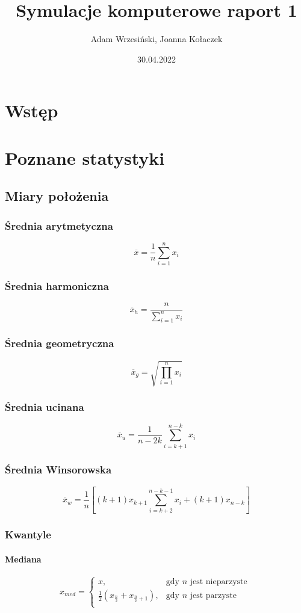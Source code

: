 \documentclass{article}
\title{Symulacje komputerowe raport 1}
\author{Adam Wrzesiński, Joanna Kołaczek}
\date{30.04.2022}
\theoremstyle{break}
\begin{document}
	\maketitle
	\tableofcontents
	\clearpage
\section{Wstęp}

\section{Poznane statystyki}
\subsection{Miary położenia}
\subsubsection{Średnia arytmetyczna}
$$\overline{x}=\frac{1}{n}\sum\limits_{i=1}^{n}x_i$$
\subsubsection{Średnia harmoniczna}
$$\overline{x}_h=\frac{n}{\sum\limits_{i=1}^{n}x_i}$$
\subsubsection{Średnia geometryczna}
$$\overline{x}_g=\sqrt{\prod\limits_{i=1}^{n}x_i}$$
\subsubsection{Średnia ucinana}
$$\overline{x}_u=\frac{1}{n-2k}\sum\limits_{i=k+1}^{n-k}x_i$$
\subsubsection{Średnia Winsorowska}
$$\overline{x}_w=\frac{1}{n}[(k+1)x_{k+1}\sum\limits_{i=k+2}^{n-k-1}x_i +(k+1)x_{n-k}]$$
\subsubsection{Kwantyle}
\paragraph{Mediana}
$$x_{med}=
\begin{cases}
	x, &  \text{gdy $n$ jest nieparzyste }\\
	\frac{1}{2}(x_{\frac{n}{2}}+x_{\frac{n}{2}+1}), &  \text{gdy $n$ jest parzyste}\\
\end{cases}$$
\end{document}
